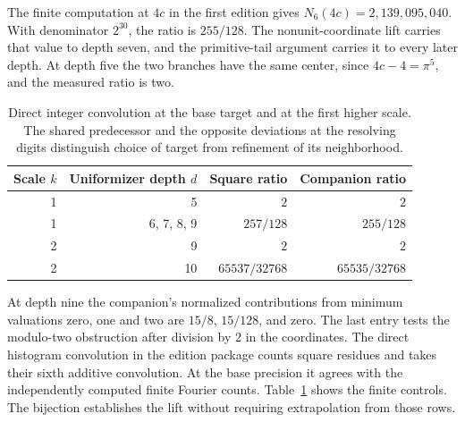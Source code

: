 \documentclass[12pt,letterpaper]{article}
\begin{document}
The finite computation at $4c$ in the first edition gives $N_6(4c)=2{,}139{,}095{,}040$. With denominator $2^{30}$, the ratio is $255/128$. The nonunit-coordinate lift carries that value to depth seven, and the primitive-tail argument carries it to every later depth. At depth five the two branches have the same center, since $4c-4=\pi^5$, and the measured ratio is two.

\begin{table}[htbp]
\centering
\begin{tabular}{@{}r r r r@{}}
\toprule
Scale $k$ & Uniformizer depth $d$ & Square ratio & Companion ratio \\
\midrule
1 & 5 & $2$ & $2$ \\
1 & 6, 7, 8, 9 & $257/128$ & $255/128$ \\
2 & 9 & $2$ & $2$ \\
2 & 10 & $65537/32768$ & $65535/32768$ \\
\bottomrule
\end{tabular}
\caption{Direct integer convolution at the base target and at the first higher scale. The shared predecessor and the opposite deviations at the resolving digits distinguish choice of target from refinement of its neighborhood.}
\label{tab:companion-controls}
\end{table}

At depth nine the companion's normalized contributions from minimum valuations zero, one and two are $15/8$, $15/128$, and zero. The last entry tests the modulo-two obstruction after division by $2$ in the coordinates. The direct histogram convolution in the edition package counts square residues and takes their sixth additive convolution. At the base precision it agrees with the independently computed finite Fourier counts. Table~\ref{tab:companion-controls} shows the finite controls. The bijection establishes the lift without requiring extrapolation from those rows.
\end{document}
